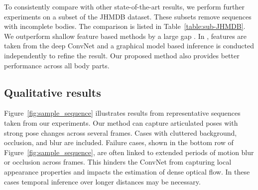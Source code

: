 \documentclass[10pt,twocolumn,letterpaper]{article}
\newcommand{\figref}[1]{Figure~\ref{#1}}
\newcommand{\reftab}[1]{Table~\ref{#1}}
\begin{document}
\begin{table}[h]
\begin{center}
\end{center}
\caption{PCK@0.2 results on sub-JHMDB dataset. We compare with other previous methods and our own baselines.}
\label{table:sub-JHMDB}
\end{table}%
To consistently compare with other state-of-the-art results, we perform further experiments on a subset of the JHMDB dataset. These subsets remove sequences with incomplete bodies. The comparison is listed in \reftab{table:sub-JHMDB}. We outperform shallow feature based methods by a large gap \cite{park2011n,xiaohan2015joint}. In \cite{iqbal2016pose}, features are taken from the deep ConvNet and a graphical model based inference is conducted independently to refine the result. Our proposed method also provides better performance across all body parts.

\subsection{Qualitative results}\figref{fig:sample_sequence} illustrates results from representative sequences taken from our experiments. Our method can capture articulated poses with strong pose changes across several frames. Cases with cluttered background, occlusion, and blur are included. Failure cases, shown in the bottom row of \figref{fig:sample_sequence}, are often linked to extended periods of motion blur or occlusion across frames. This hinders the ConvNet from capturing local appearance properties and impacts the estimation of dense optical flow. In these cases temporal inference over longer distances may be necessary.
\end{document}
